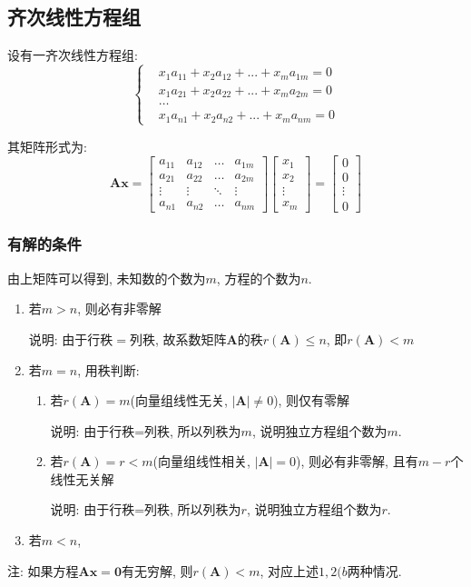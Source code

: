\subsection{齐次线性方程组}
设有一齐次线性方程组:
\begin{equation*}
\left\{
\begin{aligned}
& x_{1}a_{11}+x_{2}a_{12}+...+x_{m}a_{1m}=0 \\
& x_{1}a_{21}+x_{2}a_{22}+...+x_{m}a_{2m}=0 \\
& \dots \\
& x_{1}a_{n1}+x_{2}a_{n2}+...+x_{m}a_{nm}=0
\end{aligned}
\right.
\end{equation*}\par
其矩阵形式为:
\begin{equation*}
\bm{A}\bm{x}=
\begin{bmatrix}
a_{11} & a_{12} & \dots & a_{1m} \\
a_{21} & a_{22} & \dots & a_{2m} \\
\vdots & \vdots & \ddots & \vdots \\
a_{n1} & a_{n2} & \dots & a_{nm}
\end{bmatrix}
\begin{bmatrix}
x_{1} \\
x_{2} \\
\vdots \\
x_{m}
\end{bmatrix}=
\begin{bmatrix}
0 \\
0 \\
\vdots \\
0
\end{bmatrix}
\end{equation*}
\subsubsection{有解的条件}\label{齐次方程组有解的条件}
由上矩阵可以得到, 未知数的个数为$ m $, 方程的个数为$ n $.
\begin{enumerate}
\item 若$ m>n $, 则必有非零解 \par
说明: 由于行秩$ = $列秩, 故系数矩阵$ \bm{A} $的秩$ r(\bm{A})\le n $, 即$ r(\bm{A})<m $
\item 若$ m=n $, 用秩判断:
\begin{enumerate}
\item 若$ r(\bm{A})=m $(向量组线性无关, $ |\bm{A}|\neq 0 $), 则仅有零解 \par
说明: 由于行秩=列秩, 所以列秩为$ m $, 说明独立方程组个数为$ m $.
\item 若$ r(\bm{A})=r<m $(向量组线性相关, $ |\bm{A}| = 0 $), 则必有非零解, 且有$ m-r $个线性无关解 \par
说明: 由于行秩=列秩, 所以列秩为$ r $, 说明独立方程组个数为$ r $.
\end{enumerate}
\item 若$ m<n $,
\end{enumerate}\par
注: 如果方程$ \bm{A}\bm{x}=\bm{0} $有无穷解, 则$ r(\bm{A})<m $, 对应上述$ 1,2(b $两种情况.
